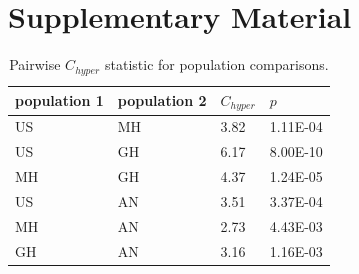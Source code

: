 \chapter{\hpc Supplementary Material}
\begin{table}[h!]
\centering
\caption{Pairwise $C_{hyper}$ statistic for population comparisons.}
\begin{tabular}{@{}llll@{}}
\toprule
population 1 & population 2 & $C_{hyper}$   & $p$  \\ \midrule
US   & MH   & 3.82 & 1.11E-04 \\
US   & GH   & 6.17 & 8.00E-10 \\
MH   & GH   & 4.37 & 1.24E-05 \\
US   & AN   & 3.51 & 3.37E-04 \\
MH   & AN   & 2.73 & 4.43E-03 \\
GH   & AN   & 3.16 & 1.16E-03 \\ \bottomrule
\end{tabular}
\label{tab:C_hyper}
\end{table}

